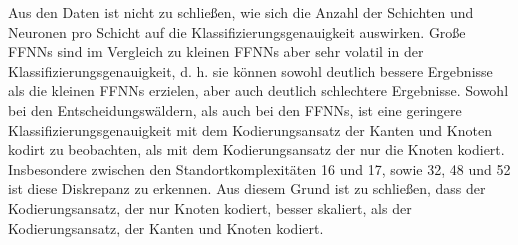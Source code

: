 Aus den Daten ist nicht zu schließen, wie sich die Anzahl der Schichten und Neuronen pro Schicht auf die Klassifizierungsgenauigkeit auswirken.
Große FFNNs sind im Vergleich zu kleinen FFNNs aber sehr volatil in der Klassifizierungsgenauigkeit,
d. h. sie können sowohl deutlich bessere Ergebnisse als die kleinen FFNNs erzielen, aber auch deutlich schlechtere Ergebnisse.
\newline
\newline
Sowohl bei den Entscheidungswäldern, als auch bei den FFNNs, ist eine geringere Klassifizierungsgenauigkeit mit dem Kodierungsansatz der Kanten und Knoten kodirt
zu beobachten, als mit dem Kodierungsansatz der nur die Knoten kodiert.
Insbesondere zwischen den Standortkomplexitäten 16 und 17, sowie 32, 48 und 52 ist diese Diskrepanz zu erkennen.
Aus diesem Grund ist zu schließen, dass der Kodierungsansatz, der nur Knoten kodiert, besser skaliert, als der Kodierungsansatz, der Kanten und Knoten kodiert.